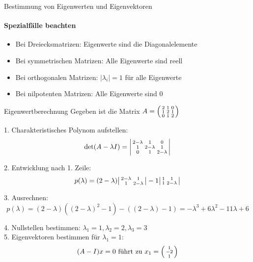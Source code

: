 \begin{KR}{Bestimmung von Eigenwerten und Eigenvektoren}
\paragraph{Spezialfälle beachten}
\begin{itemize}
    \item Bei Dreiecksmatrizen: Eigenwerte sind die Diagonalelemente
    \item Bei symmetrischen Matrizen: Alle Eigenwerte sind reell
    \item Bei orthogonalen Matrizen: $|\lambda_i| = 1$ für alle Eigenwerte
    \item Bei nilpotenten Matrizen: Alle Eigenwerte sind 0
\end{itemize}
\end{KR}

\begin{example2}{Eigenwertberechnung}
Gegeben ist die Matrix
$A = \begin{psmallmatrix} 
2 & 1 & 0 \\
1 & 2 & 1 \\
0 & 1 & 2
\end{psmallmatrix}$

1. Charakteristisches Polynom aufstellen:
   $$\det(A - \lambda I) = \begin{vsmallmatrix} 
   2-\lambda & 1 & 0 \\
   1 & 2-\lambda & 1 \\
   0 & 1 & 2-\lambda
   \end{vsmallmatrix}$$
   
2. Entwicklung nach 1. Zeile:
   $$p(\lambda) = (2-\lambda)\begin{vsmallmatrix}
   2-\lambda & 1 \\
   1 & 2-\lambda
   \end{vsmallmatrix} - 1\begin{vsmallmatrix}
   1 & 1 \\
   1 & 2-\lambda
   \end{vsmallmatrix}$$
   
3. Ausrechnen:
   $$p(\lambda) = (2-\lambda)((2-\lambda)^2 - 1) - ((2-\lambda) - 1)
   = -\lambda^3 + 6\lambda^2 - 11\lambda + 6$$
   
4. Nullstellen bestimmen:
   $\lambda_1 = 1, \lambda_2 = 2, \lambda_3 = 3$
\vspace{1mm}\\
5. Eigenvektoren bestimmen für $\lambda_1 = 1$:
   $$(A - I)x = 0 \text{ führt zu } x_1 = \begin{psmallmatrix} 1 \\ -2 \\ 1 \end{psmallmatrix}$$
\end{example2}

